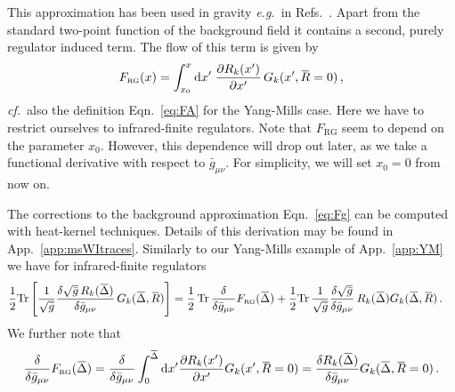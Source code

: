 \documentclass[11pt]{book}
\newcommand{\overbar}[1]{\mkern 1.5mu\overline{\mkern-1.5mu#1\mkern-1.5mu}\mkern 1.5mu}
\newcommand{\bR}{\overbar R}
\newcommand{\Tr}{\mathrm{Tr}}
\newcommand\FRG{ F_{\scriptscriptstyle{\mathrm{RG}}} }
\newcommand\eg{\textit{e.g.}\ }
\newcommand\cf{\textit{cf.}\ }
\numberwithin{equation}{chapter}
\begin{document}
This approximation has been used in gravity \eg in Refs.~\cite{Donkin,Donkin:2012ud}.
Apart from the standard two-point function of the background field it contains a second,
purely regulator induced term. The flow of this term is given by
\begin{align}
	\FRG(x)
  = \int_{x_0}^x \mathrm dx' \; \frac{\partial R_k(x')}{\partial x'} \, G_k(x', \bR = 0)\,,
  \label{eq:Fg}
\end{align}
\cf also the definition Eqn.~\eqref{eq:FA} for the Yang-Mills case.
Here we have to restrict ourselves to infrared-finite regulators.
Note that $\FRG$ seem to depend on the parameter $x_0$.
However, this dependence will drop out later, as we take a functional derivative
with respect to $\bar g_{\mu\nu}$.  For simplicity, we will set $x_0=0$ from now on.


The corrections to the background approximation Eqn.~\eqref{eq:Fg}
can be computed with heat-kernel techniques. Details of this derivation
may be found in App.~\ref{app:msWItraces}.
Similarly to our Yang-Mills example of App.~\ref{app:YM}
we have for infrared-finite regulators
\begin{align}
  \frac 12 \Tr&\left[ \frac{1}{\sqrt{\bar g}}\frac{\delta \sqrt{\bar g} \, R_k(\overbar \Delta)}{\delta \bar g_{\mu\nu}}\,G_k(\overbar \Delta, \bR )\right]
  =\frac{1}{2} \, \Tr\, \frac{\delta }{\delta \bar g_{\mu\nu}} \FRG(\overbar\Delta)
  +\frac{1}{2} \Tr \, \frac{1}{\sqrt{\bar g}}\frac{\delta \sqrt{\bar g}}{\delta \bar g_{\mu\nu}}\, R_k(\overbar \Delta) G_k (\overbar \Delta, \bR ) \,.
  \label{eq:g-Rkg}
\end{align}
We further note that
\begin{align}
 \frac{\delta}{\delta \bar g_{\mu\nu}} \FRG(\overbar \Delta)
 = \frac{\delta}{\delta \bar g_{\mu\nu}} \int_{0}^{\overbar\Delta} \mathrm dx' \frac{\partial R_k(x')}{\partial x'} G_k(x', \bR = 0)
 = \frac{\delta R_k(\overbar \Delta)}{ \delta \bar g_{\mu\nu}} G_k(\overbar \Delta, \bR = 0)  \,. \label{eq:der-F}
\end{align}
\end{document}
